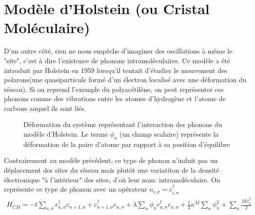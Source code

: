 \section{Modèle d'Holstein (ou Cristal Moléculaire)}
D'un autre côté, rien ne nous empêche d'imaginer des oscillations à même
le "site", c'est à dire l'existence de phonons intramoléculaires. Ce modèle
a été introduit par Holstein en 1959 lorsqu'il tentait d'étudier le
mouvement des polarons(une quasiparticule formé d'un électron localisé
avec une déformation du réseau)\cite{holstein-studies-1959}. Si on reprend
l'exemple du polyacétilène, on peut représenter ces phonons comme des
vibrations entre les atomes d'hydrogène et l'atome de carbone auquel ils
sont liés.
\begin{figure}[H]
    \centering
    \caption{Déformation du système représentant l'interaction des phonons
    du modèle d'Holstein. Le terme $\phi_n$ (un champ scalaire) représente
    la déformation de la paire d'atome par rapport à sa position
    d'équilibre}
\end{figure}
Contrairement au modèle précédent, ce type de phonon n'induit pas un déplacement
des sites du réseau mais plutôt une variatiton de la densité électronique "à
l'intérieur" des sites, d'où leur nom: intramoléculaire. On représente ce type
de phonon avec un opérateur $n_{i,\sigma} = c^\dagger_{i,\sigma}$
\begin{align}
    H_{CM} =-t\sum_{n,\sigma} c^\dagger_{n,\sigma}c_{n+1,\sigma}
    + c^\dagger_{n+1,\sigma}c_{n,\sigma}  + \lambda\sum_n\phi_n
    c^\dagger_{n,\sigma}c_{n,\sigma} + \frac{1}{2}\kappa^{M}\sum_n\phi_n^2
    + \sum_n\frac{M\dot{\phi}_n^2}{2}
\end{align}
